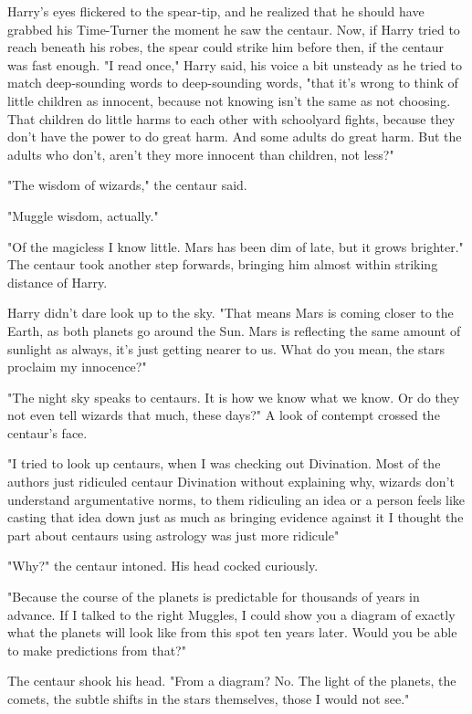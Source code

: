 Harry's eyes flickered to the spear-tip, and he realized that he should have
grabbed his Time-Turner the moment he saw the centaur. Now, if Harry tried to
reach beneath his robes, the spear could strike him before then, if the centaur
was fast enough. "I read once," Harry said, his voice a bit unsteady as he
tried to match deep-sounding words to deep-sounding words, "that it's wrong to
think of little children as innocent, because not knowing isn't the same as not
choosing. That children do little harms to each other with schoolyard fights,
because they don't have the power to do great harm. And some adults do great
harm. But the adults who don't, aren't they more innocent than children, not
less?"

"The wisdom of wizards," the centaur said.

"Muggle wisdom, actually."

"Of the magicless I know little. Mars has been dim of late, but it grows
brighter." The centaur took another step forwards, bringing him almost within
striking distance of Harry.

Harry didn't dare look up to the sky. "That means Mars is coming closer to the
Earth, as both planets go around the Sun. Mars is reflecting the same amount of
sunlight as always, it's just getting nearer to us. What do you mean, the stars
proclaim my innocence?"

"The night sky speaks to centaurs. It is how we know what we know. Or do they
not even tell wizards that much, these days?" A look of contempt crossed the
centaur's face.

"I{\el} tried to look up centaurs, when I was checking out Divination. Most
of the authors just ridiculed centaur Divination without explaining why,
wizards don't understand argumentative norms, to them ridiculing an idea or a
person feels like casting that idea down just as much as bringing evidence
against it{\el} I thought the part about centaurs using astrology was just
more ridicule{\el}"

"Why?" the centaur intoned. His head cocked curiously.

"Because the course of the planets is predictable for thousands of years in
advance. If I talked to the right Muggles, I could show you a diagram of
exactly what the planets will look like from this spot ten years later. Would
you be able to make predictions from that?"

The centaur shook his head. "From a diagram? No. The light of the planets, the
comets, the subtle shifts in the stars themselves, those I would not see."

